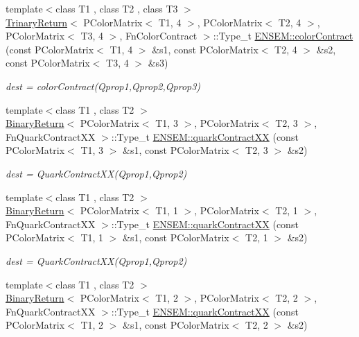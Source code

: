 \begin{DoxyCompactItemize}
{\footnotesize template$<$class T1 , class T2 , class T3 $>$ }\\\mbox{\hyperlink{structTrinaryReturn}{Trinary\+Return}}$<$ P\+Color\+Matrix$<$ T1, 4 $>$, P\+Color\+Matrix$<$ T2, 4 $>$, P\+Color\+Matrix$<$ T3, 4 $>$, Fn\+Color\+Contract $>$\+::Type\+\_\+t \mbox{\hyperlink{group__primcolormatrix_ga2cd5ca8c1ac1d4fbf5c4d27665ccb996}{E\+N\+S\+E\+M\+::color\+Contract}} (const P\+Color\+Matrix$<$ T1, 4 $>$ \&s1, const P\+Color\+Matrix$<$ T2, 4 $>$ \&s2, const P\+Color\+Matrix$<$ T3, 4 $>$ \&s3)
\begin{DoxyCompactList}\small\item\em dest = color\+Contract(\+Qprop1,\+Qprop2,\+Qprop3) \end{DoxyCompactList}\item 
{\footnotesize template$<$class T1 , class T2 $>$ }\\\mbox{\hyperlink{structBinaryReturn}{Binary\+Return}}$<$ P\+Color\+Matrix$<$ T1, 3 $>$, P\+Color\+Matrix$<$ T2, 3 $>$, Fn\+Quark\+Contract\+XX $>$\+::Type\+\_\+t \mbox{\hyperlink{group__primcolormatrix_ga2253a81d9cf66ad41a9c2426ef5a8b84}{E\+N\+S\+E\+M\+::quark\+Contract\+XX}} (const P\+Color\+Matrix$<$ T1, 3 $>$ \&s1, const P\+Color\+Matrix$<$ T2, 3 $>$ \&s2)
\begin{DoxyCompactList}\small\item\em dest = Quark\+Contract\+X\+X(\+Qprop1,\+Qprop2) \end{DoxyCompactList}\item 
{\footnotesize template$<$class T1 , class T2 $>$ }\\\mbox{\hyperlink{structBinaryReturn}{Binary\+Return}}$<$ P\+Color\+Matrix$<$ T1, 1 $>$, P\+Color\+Matrix$<$ T2, 1 $>$, Fn\+Quark\+Contract\+XX $>$\+::Type\+\_\+t \mbox{\hyperlink{group__primcolormatrix_gadb40ddb5edfab27bf7bb4b8cd7430ad6}{E\+N\+S\+E\+M\+::quark\+Contract\+XX}} (const P\+Color\+Matrix$<$ T1, 1 $>$ \&s1, const P\+Color\+Matrix$<$ T2, 1 $>$ \&s2)
\begin{DoxyCompactList}\small\item\em dest = Quark\+Contract\+X\+X(\+Qprop1,\+Qprop2) \end{DoxyCompactList}\item 
{\footnotesize template$<$class T1 , class T2 $>$ }\\\mbox{\hyperlink{structBinaryReturn}{Binary\+Return}}$<$ P\+Color\+Matrix$<$ T1, 2 $>$, P\+Color\+Matrix$<$ T2, 2 $>$, Fn\+Quark\+Contract\+XX $>$\+::Type\+\_\+t \mbox{\hyperlink{group__primcolormatrix_gaeaaf0956a43ba474c9f772480094c1f5}{E\+N\+S\+E\+M\+::quark\+Contract\+XX}} (const P\+Color\+Matrix$<$ T1, 2 $>$ \&s1, const P\+Color\+Matrix$<$ T2, 2 $>$ \&s2)

\end{DoxyCompactItemize}
